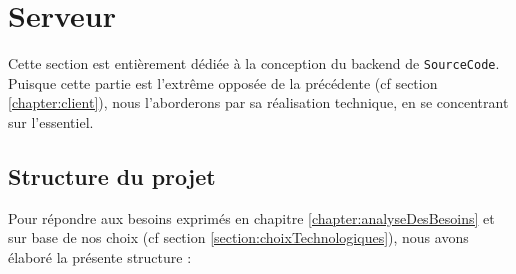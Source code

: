 \pagebreak
\section{Serveur}
\label{chapter:api}


Cette section est entièrement dédiée à la conception du \gls{backend} de \texttt{SourceCode}.
Puisque cette partie est l'extrême opposée de la précédente (cf section \ref{chapter:client}), nous l'aborderons par sa réalisation technique, en se concentrant sur l'essentiel.

\subsection{Structure du projet}

Pour répondre aux besoins exprimés en chapitre \ref{chapter:analyseDesBesoins} et sur base de nos choix (cf section \ref{section:choixTechnologiques}), nous avons élaboré la présente structure :

